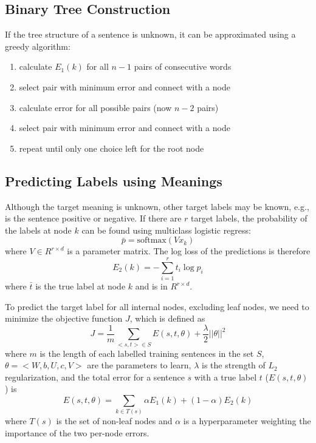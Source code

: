 \documentclass{article}
\begin{document}
%
%
\subsection{Binary Tree Construction}
\label{sec:greedy}
If the tree structure of a sentence is unknown, it can be approximated using a greedy algorithm:
\begin{enumerate}
    \item calculate $E_1(k)$ for all $n - 1$ pairs of consecutive words
    \item select pair with minimum error and connect with a node
    \item calculate error for all possible pairs (now $n-2$ pairs)
    \item select pair with minimum error and connect with a node
    \item repeat until only one choice left for the root node
\end{enumerate}


%
%
\subsection{Predicting Labels using Meanings}
Although the target meaning is unknown, other target labels may be known, e.g., is the sentence positive or negative. If there are $r$ target labels, the probability of the labels at node $k$ can be found using multiclass logistic regress:
\begin{equation}
    \bar{p} = \textrm{softmax}(V x_k)
\end{equation}
where $V \in R^{r \times d}$ is a parameter matrix. The log loss of the predictions is therefore
\begin{equation}
    E_2 (k) = - \sum_{i=1}^r t_i \log p_i
\end{equation}
where $\bar{t}$ is the true label at node $k$ and is in $R^{r \times d}$.

To predict the target label for all internal nodes, excluding leaf nodes, we need to minimize the objective function $J$, which is defined as
\begin{equation}
    J = \frac{1}{m} \sum_{<s,t> \in S} E(s, t, \theta) + \frac{\lambda}{2} ||\theta||^2
\end{equation}
where $m$ is the length of each labelled training sentences in the set $S$, $\theta = < W, b, U, c, V >$ are the parameters to learn, $\lambda$ is the strength of $L_2$ regularization, and the total error for a sentence $s$ with a true label $t$ ($E(s, t, \theta)$) is
\begin{equation}
    E(s,t, \theta) = \sum_{k \in T(s)} \alpha E_1(k) + (1-\alpha) E_2(k)
\end{equation}
where $T(s)$ is the set of non-leaf nodes and $\alpha$ is a hyperparameter weighting the importance of the two per-node errors.
\end{document}
